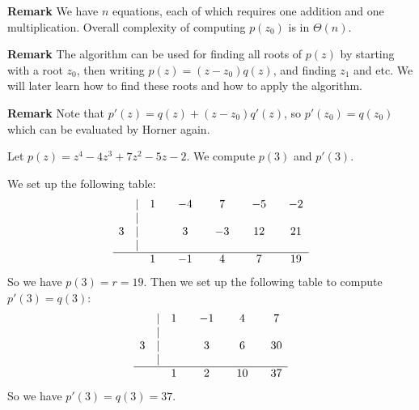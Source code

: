 \documentclass[main.tex]{subfiles}
\begin{document}
\par \noindent \textbf{Remark} We have $n$ equations, each of which requires one addition and one multiplication. Overall complexity of computing $p(z_0)$ is in $\Theta (n)$. 

\par \noindent \textbf{Remark} The algorithm can be used for finding all roots of $p(z)$ by starting with a root $z_0$, then writing $p(z) = (z - z_0)q(z)$, and finding $z_1$ and etc. We will later learn how to find these roots and how to apply the algorithm. 

\par \noindent \textbf{Remark} Note that $p'(z) = q(z) + (z - z_0)q'(z)$, so $p'(z_0) = q(z_0)$ which can be evaluated by Horner again. 
\begin{example}
    Let $p(z) = z^4 - 4z^3 + 7z^2 - 5z -2$. We compute $p(3)$ and $p'(3)$. 
\end{example}
\par We set up the following table:
\[
    \begin{array}{ccccccccccc}
        \null &  |  & 1 &     & -4 &     & 7 &     & -5 &     & -2 \\
        \null &  |  & \null &         & \null &         & \null &     & \null &     \\
        3&  |  &    &     & 3 &     & -3 &     & 12 &     & 21 \\
        \null &  |  & \null &         & \null &         & \null &     & \null &     \\
        \hline 
        \null &    &1 &     & -1&     & 4&     & 7&     & 19 \\
    \end{array}
\]
So we have $p(3) = r = 19$. Then we set up the following table to compute $p'(3) = q(3)$:
\[
    \begin{array}{ccccccccc}
        \null &  |  & 1 &     & -1 &     & 4 &     & 7 \\
        \null &  |  & \null &         & \null &         & \null &     \\
        3&  |  &    &     & 3 &     & 6 &     & 30 \\
        \null &  |  & \null &         & \null &         & \null &     \\
        \hline 
        \null &    &1 &     & 2&     & 10&     & 37 \\
    \end{array}
\]
So we have $p'(3) = q(3) = 37$. 
\end{document}
